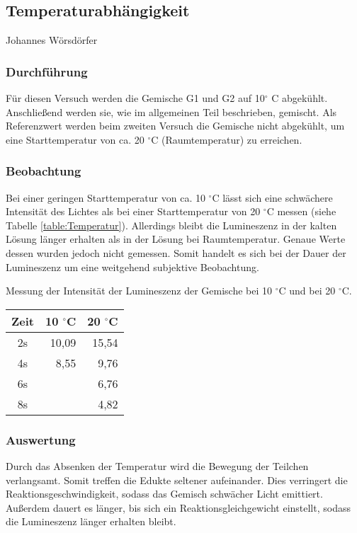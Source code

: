 \subsection{Temperaturabhängigkeit}
Johannes Wörsdörfer
\subsubsection{Durchführung}
Für diesen Versuch werden die Gemische G1 und G2 auf 10$^\circ$ C abgekühlt. Anschließend werden sie, wie im allgemeinen Teil beschrieben, gemischt. Als Referenzwert werden beim zweiten Versuch die Gemische nicht abgekühlt, um eine Starttemperatur von ca. 20 $^\circ$C (Raumtemperatur) zu erreichen.

\subsubsection{Beobachtung}
Bei einer geringen Starttemperatur von ca. 10 $^\circ$C lässt sich eine schwächere Intensität des Lichtes als bei einer Starttemperatur von 20 $^\circ$C messen (siehe Tabelle \ref{table:Temperatur}). Allerdings bleibt die Lumineszenz in der kalten Lösung länger erhalten als in der Lösung bei Raumtemperatur. Genaue Werte dessen wurden jedoch nicht gemessen. Somit handelt es sich bei der Dauer der Lumineszenz um eine weitgehend subjektive Beobachtung.

\begin{dsatable}
 \caption{Messung der Intensität der Lumineszenz der Gemische bei 10 $^\circ$C und bei 20 $^\circ$C.}
 \centering
 \begin{tabular}{crr} 
  \toprule
  Zeit      &  10 $^\circ$C  &  20 $^\circ$C \\
  \midrule
   2s		& 10,09 	& 15,54 \\
   4s		& 8,55		& 9,76	\\
   6s		&  			& 6,76	\\
   8s		& 			& 4,82	\\
  \bottomrule
 \end{tabular}
 \label{table:Temperatur}
\end{dsatable}

\subsubsection{Auswertung}
Durch das Absenken der Temperatur wird die Bewegung der Teilchen verlangsamt. Somit treffen die Edukte seltener aufeinander. Dies verringert die Reaktionsgeschwindigkeit, sodass das Gemisch schwächer Licht emittiert. Außerdem dauert es länger, bis sich ein Reaktionsgleichgewicht einstellt, sodass die Lumineszenz länger erhalten bleibt. 